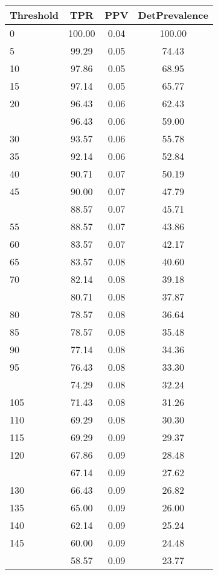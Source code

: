 \begin{table}[ht]
\centering
\begin{tabular}{lccc}
  \toprule
Threshold & TPR & PPV & DetPrevalence \\ 
  \midrule
0 & 100.00 & 0.04 & 100.00 \\ 
  5 & 99.29 & 0.05 & 74.43 \\ 
  10 & 97.86 & 0.05 & 68.95 \\ 
  15 & 97.14 & 0.05 & 65.77 \\ 
  20 & 96.43 & 0.06 & 62.43 \\ 
   \addlinespace
25 & 96.43 & 0.06 & 59.00 \\ 
  30 & 93.57 & 0.06 & 55.78 \\ 
  35 & 92.14 & 0.06 & 52.84 \\ 
  40 & 90.71 & 0.07 & 50.19 \\ 
  45 & 90.00 & 0.07 & 47.79 \\ 
   \addlinespace
50 & 88.57 & 0.07 & 45.71 \\ 
  55 & 88.57 & 0.07 & 43.86 \\ 
  60 & 83.57 & 0.07 & 42.17 \\ 
  65 & 83.57 & 0.08 & 40.60 \\ 
  70 & 82.14 & 0.08 & 39.18 \\ 
   \addlinespace
75 & 80.71 & 0.08 & 37.87 \\ 
  80 & 78.57 & 0.08 & 36.64 \\ 
  85 & 78.57 & 0.08 & 35.48 \\ 
  90 & 77.14 & 0.08 & 34.36 \\ 
  95 & 76.43 & 0.08 & 33.30 \\ 
   \addlinespace
100 & 74.29 & 0.08 & 32.24 \\ 
  105 & 71.43 & 0.08 & 31.26 \\ 
  110 & 69.29 & 0.08 & 30.30 \\ 
  115 & 69.29 & 0.09 & 29.37 \\ 
  120 & 67.86 & 0.09 & 28.48 \\ 
   \addlinespace
125 & 67.14 & 0.09 & 27.62 \\ 
  130 & 66.43 & 0.09 & 26.82 \\ 
  135 & 65.00 & 0.09 & 26.00 \\ 
  140 & 62.14 & 0.09 & 25.24 \\ 
  145 & 60.00 & 0.09 & 24.48 \\ 
   \addlinespace
150 & 58.57 & 0.09 & 23.77 \\ 

\end{tabular}
\end{table}
